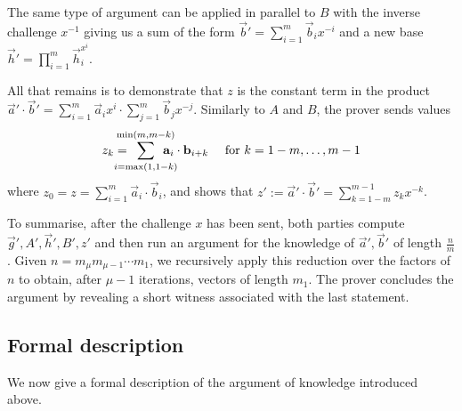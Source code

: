 The same type of argument can be applied in parallel to $B$ with the inverse challenge $x^{-1}$ giving us a sum of the form $\vec{b}'=\sum_{i=1}^m\vec{b}_ix^{-i}$ and a new base $\vec{h}'=\prod_{i=1}^m\vec{h}_i^{x^{i}}$. %

All that remains is to demonstrate that $z$ is the constant term %
in the product $\vec{a}'\cdot \vec{b}'=\sum_{i=1}^m\vec{a}_ix^i\cdot \sum_{j=1}^m\vec{b}_jx^{-j}$. Similarly to $A$ and $B$, the prover sends values 
$$z_k=\mkern-24mu\sum_{i=\max(1,1-k)}^{\min(m,m-k)}\mkern-24mu\vec{a}_i\cdot \vec{b}_{i+k}  \quad \text{  for   } k=1-m,\ldots, m-1$$
where $z_0=z=\sum_{i=1}^m \vec{a}_i\cdot\vec{b}_i$, and shows that $z':=\vec{a}' \cdot \vec{b}'=\sum_{k=1-m}^{m-1}z_kx^{-k}$.

To summarise, after the challenge $x$ has been sent, both parties compute $\vec{g}',A',\vec{h}',B',z'$ and then run an argument for the knowledge of $\vec{a}', \vec{b}'$ of length $\frac{n}{m}$. Given $n=m_\mu  m_{\mu-1} \cdots m_1$, we recursively apply this reduction over the factors of $n$ to obtain, after $\mu-1$ iterations, vectors of length $m_1$. The prover concludes the argument by revealing a short witness associated with the last statement.

\subsection{Formal description}

We now give a formal description of the argument of knowledge introduced above.


